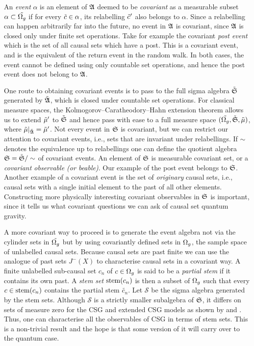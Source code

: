 An \emph{event}  $\alpha$ is  an element of $\mathfrak A$ deemed to be  \emph{covariant}  as  a measurable subset $\alpha
\subset \tilde {\Omega_g}$ if for every $\tilde c \in \alpha$,  its relabelling $\tilde c'$ also
belongs to $\alpha$. Since a relabelling can happen arbitrarily far into the future,  no event in $\mathfrak A$
is covariant, since  $\mathfrak A$ is closed only  under finite set operations. Take for example the covariant \emph{post event}
which is the set of all  causal sets which  have a post. This is a covariant event, and is the equivalent of the return event in the random walk. In both cases, the event cannot be defined using
only countable set operations, and hence the post event does not belong to $\mathfrak A$.

One route to obtaining  covariant events is to pass
to the full sigma algebra $\tilde {\mathfrak S}$  generated  by $\tilde {\mathfrak A}$, which  is closed under countable set operations.
For classical measure spaces, the  Kolmogorov--Caratheodory--Hahn extension theorem allows us to extend  $\tilde \mu'$ to $\tilde {\mathfrak S}$
and hence pass  with ease to a full measure space $(\tilde {\Omega_g}, \tilde {\mathfrak S}, \tilde \mu)$, where $\tilde \mu|_{\tilde {\mathfrak A}} = \tilde \mu'$.  Not every event
in $\mathfrak S$ is covariant, but we  can restrict our attention to covariant events, i.e., sets that are invariant under
relabellings. If  $\sim$ denotes the equivalence up to relabellings one can define the quotient algebra $\mathfrak S=\tilde {\mathfrak S}/\sim$
of covariant events. An element of $\mathfrak S$ is measurable covariant set, or a \emph{covariant observable (or beable)}. Our
example of the  post event belongs to $\mathfrak S$.  Another example of a covariant event is the set of \emph{originary} causal
sets, i.e.,  causal sets with a
single initial element  to the past of all other elements.  Constructing  more physically interesting covariant
observables in $\mathfrak S$  is important, since it tells us what covariant questions we can ask of causal set quantum gravity. 

A more covariant way to proceed is to generate the event algebra not via the cylinder sets in
$\tilde {\Omega_g}$ but by using covariantly defined sets in $\Omega_g$, the sample space of unlabelled causal sets. Because causal sets are past finite we can use the analogue of past sets
$J^-(X)$ to characterise causal sets in a covariant way.   A finite unlabelled
sub-causal set $c_n$ of $ c \in \Omega_g $ is said to be a \emph{partial stem}  if it
contains its own past. A
\emph{stem set}  $\mathrm{stem}(c_n)$ is then a subset of $\Omega_g$ such that every $c \in \mathrm{stem}(c_n)$ contains the partial stem
$\tilde{c_n}$. Let $\mathcal S$ be the sigma algebra generated by the stem sets. Although $\mathcal S $ is a strictly
smaller subalgebra of $\mathfrak S$, it differs on sets of measure zero for the CSG and extended CSG models as shown by 
\cite{observables} and \cite{observablesds}.  Thus, one can characterise all the observables of CSG in terms of stem sets. This is
a non-trivial result and the hope is that some version of it will carry over to the quantum case.    


